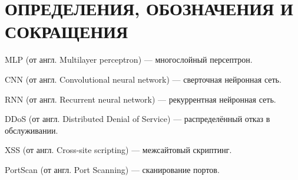 \maketableofcontents

\chapter*{ОПРЕДЕЛЕНИЯ, ОБОЗНАЧЕНИЯ И СОКРАЩЕНИЯ}


MLP (от англ. Multilayer perceptron) --- многослойный персептрон.

CNN (от англ. Convolutional neural network) --- сверточная нейронная сеть.

RNN (от англ. Recurrent neural network) --- рекуррентная нейронная сеть.


DDoS (от англ. Distributed Denial of Service) --- распределённый отказ в обслуживании.

XSS (от англ. Cross-site scripting) --- межсайтовый скриптинг.

PortScan (от англ. Port Scanning) --- сканирование портов.


